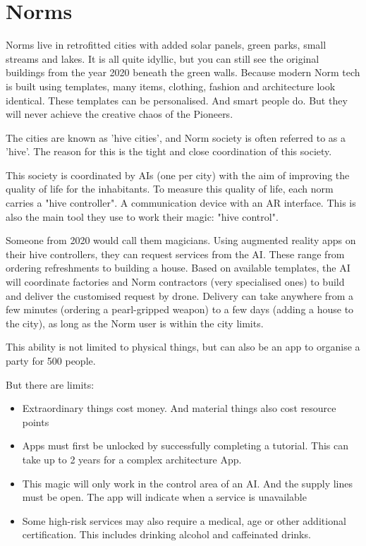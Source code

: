 \section{Norms}
\label{sec:Norms}

Norms live in retrofitted cities with added solar panels, green parks, small streams and lakes. It is all quite idyllic, but you can still see the original buildings from the year 2020 beneath the green walls.
Because modern Norm tech is built using templates, many items, clothing, fashion and architecture look identical. These templates can be personalised. And smart people do. But they will never achieve the creative chaos of the Pioneers.

The cities are known as 'hive cities', and Norm society is often referred to as a 'hive'. The reason for this is the tight and close coordination of this society.

This society is coordinated by AIs (one per city) with the aim of improving the quality of life for the inhabitants.
To measure this quality of life, each norm carries a "hive controller". A communication device with an AR interface. This is also the main tool they use to work their magic: "hive control".

Someone from 2020 would call them magicians. Using augmented reality apps on their hive controllers, they can request services from the AI. These range from ordering refreshments to building a house.
Based on available templates, the AI will coordinate factories and Norm contractors (very specialised ones) to build and deliver the customised request by drone.
Delivery can take anywhere from a few minutes (ordering a pearl-gripped weapon) to a few days (adding a house to the city), as long as the Norm user is within the city limits.

This ability is not limited to physical things, but can also be an app to organise a party for 500 people.

But there are limits:

\begin{itemize}
    \item Extraordinary things cost money. And material things also cost resource points
    \item Apps must first be unlocked by successfully completing a tutorial. This can take up to 2 years for a complex architecture App.
    \item This magic will only work in the control area of an AI. And the supply lines must be open. The app will indicate when a service is unavailable
    \item Some high-risk services may also require a medical, age or other additional certification. This includes drinking alcohol and caffeinated drinks.
\end{itemize}


